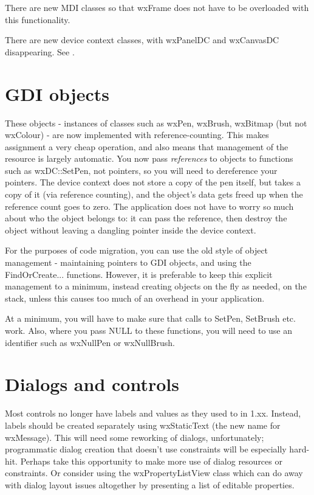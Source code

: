There are new MDI classes so that wxFrame does not have to be overloaded with this
functionality.

There are new device context classes, with wxPanelDC and wxCanvasDC disappearing.
See .

\section{GDI objects}\label{portinggdiobjects}

These objects - instances of classes such as wxPen, wxBrush, wxBitmap (but not wxColour) -
are now implemented with reference-counting. This makes assignment a very cheap operation,
and also means that management of the resource is largely automatic. You now pass {\it references} to
objects to functions such as wxDC::SetPen, not pointers, so you will need to dereference your pointers.
The device context does not store a copy of the pen
itself, but takes a copy of it (via reference counting), and the object's data gets freed up
when the reference count goes to zero. The application does not have to worry so much about
who the object belongs to: it can pass the reference, then destroy the object without
leaving a dangling pointer inside the device context.

For the purposes of code migration, you can use the old style of object management - maintaining
pointers to GDI objects, and using the FindOrCreate... functions. However, it is preferable to
keep this explicit management to a minimum, instead creating objects on the fly as needed, on the stack,
unless this causes too much of an overhead in your application.

At a minimum, you will have to make sure that calls to SetPen, SetBrush etc. work. Also, where you pass NULL to these
functions, you will need to use an identifier such as wxNullPen or wxNullBrush.

\section{Dialogs and controls}\label{portingdialogscontrols}


Most controls no longer have labels and values as they used to in 1.xx. Instead, labels
should be created separately using wxStaticText (the new name for wxMessage). This will
need some reworking of dialogs, unfortunately; programmatic dialog creation that doesn't
use constraints will be especially hard-hit. Perhaps take this opportunity to make more
use of dialog resources or constraints. Or consider using the wxPropertyListView class
which can do away with dialog layout issues altogether by presenting a list of editable
properties.

